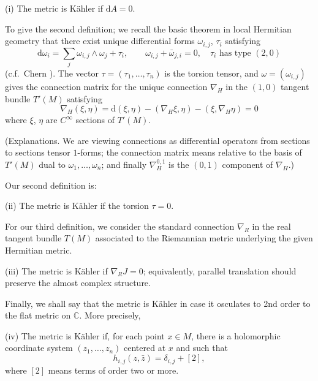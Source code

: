 \documentclass[11pt]{amsart}
\theoremstyle{plain}
\theoremstyle{definition}
\newcommand{\dd}{\mathrm{d}}
\newcommand{\CC}{\mathbb{C}}
\begin{document}
(i) The metric is K\"ahler if $\dd A = 0$.

To give the second definition; we recall the basic theorem in local Hermitian geometry that there exist unique differential forms $\omega_{i,j}$, $\tau_{i}$ satisfying
\begin{equation}\label{eq:5.2}
\dd\omega_{i} = \sum_{j} \omega_{i,j} \wedge \omega_{j} + \tau_{i}, \qquad \omega_{i,j} + \bar{\omega}_{j,i} = 0, \quad \tau_{i} \text{ has type } (2,0)
\end{equation}
(c.f.\ Chern \cite{Ch}). The vector $\tau = (\tau_{1}, \ldots, \tau_{n})$ is the torsion tensor, and $\omega = (\omega_{i,j})$ gives the connection matrix for the unique connection $\nabla_{H}$ in the $(1,0)$ tangent bundle $T'(M)$ satisfying
\[
\nabla_{H}(\xi, \eta) = \dd(\xi, \eta) - (\nabla_{H}\xi, \eta) - (\xi, \nabla_{H}\eta) = 0
\]
where $\xi$, $\eta$ are $C^{\infty}$ sections of $T'(M)$.

(Explanations. We are viewing connections as differential operators from sections to sections tensor $1$-forms; the connection matrix means relative to the basis of $T'(M)$ dual to $\omega_{1}, \ldots, \omega_{n}$; and finally $\nabla_{H}^{0,1}$ is the $(0,1)$ component of $\nabla_{H}$.)

Our second definition is:

(ii) The metric is K\"ahler if the torsion $\tau = 0$.

For our third definition, we consider the standard connection $\nabla_{R}$ in the real tangent bundle $T(M)$ associated to the Riemannian metric underlying the given Hermitian metric.

(iii) The metric is K\"ahler if $\nabla_{R} J = 0$; equivalently, parallel translation should preserve the almost complex structure.

Finally, we shall say that the metric is K\"ahler in case it osculates to 2nd order to the flat metric on $\CC$. More precisely,

(iv) The metric is K\"ahler if, for each point $x \in M$, there is a holomorphic coordinate system $(z_{1}, \ldots, z_{n})$ centered at $x$ and such that
\begin{equation}\label{eq:5.3}
h_{i,j}(z, \bar{z}) = \delta_{i,j} + [2],
\end{equation}
where $[2]$ means terms of order two or more.
\end{document}
